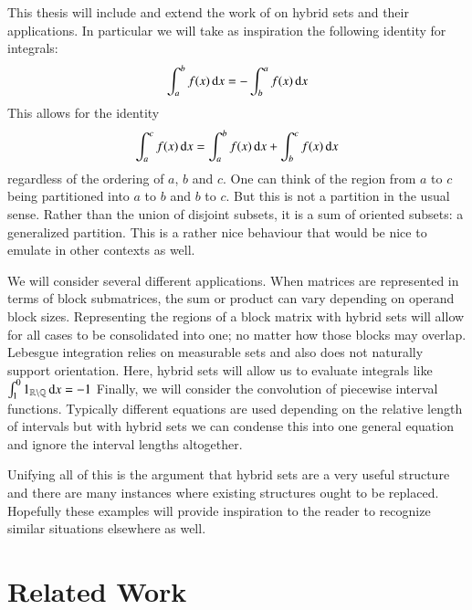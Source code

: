 This thesis will include and extend the work of \cite{carette2010} on hybrid sets and their applications.
In particular we will take as inspiration the following identity for integrals:
\begin{equation}
	\int_a^b f(x) \mathop{}\!\mathrm{d} x = -\int_b^a f(x) \mathop{}\!\mathrm{d} x
\end{equation}
This allows for the identity
\begin{equation}
	\int_a^c f(x) \mathop{}\!\mathrm{d} x = \int_a^b f(x) \mathop{}\!\mathrm{d} x + \int_b^c f(x) \mathop{}\!\mathrm{d} x
\end{equation}
regardless of the ordering of $a$, $b$ and $c$.
One can think of the region from $a$ to $c$ being partitioned into $a$ to $b$ and $b$ to $c$.
But this is not a partition in the usual sense.
Rather than the union of disjoint subsets, it is a sum of oriented subsets: a generalized partition.
This is a rather nice behaviour that would be nice to emulate in other contexts as well.


We will consider several different applications.
When matrices are represented in terms of block submatrices, 
the sum or product can vary depending on operand block sizes.
Representing the regions of a block matrix with hybrid sets will allow for all cases to be consolidated into one;
no matter how those blocks may overlap.
Lebesgue integration relies on measurable sets and also does not naturally support orientation.
Here, hybrid sets will allow us to evaluate integrals like $\int_1^0 1_{\mathbb{R} \setminus \mathbb{Q}} \mathop{}\!\mathrm{d} x = -1$
Finally, we will consider the convolution of piecewise interval functions.
Typically different equations are used depending on the relative length of intervals but with hybrid sets we can condense this
into one general equation and ignore the interval lengths altogether.


Unifying all of this is the argument that hybrid sets are a very useful structure and there are many instances where existing
structures ought to be replaced.
Hopefully these examples will provide inspiration to the reader to recognize similar situations elsewhere as well.




\section{Related Work}


